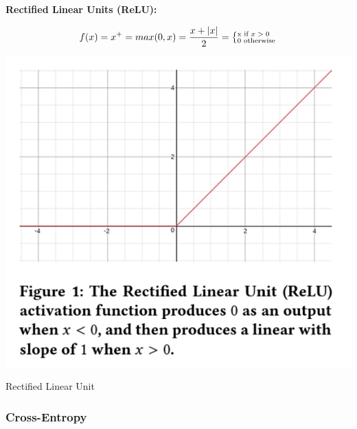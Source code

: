 \documentclass[12pt]{article}
\begin{document}
                \textbf{Rectified Linear Units (ReLU):}
            
                \begin{large}
                    
                    \[ f(x) = x^+ = max(0, x) = \frac{x + \vert x \vert}{2} = 
                    \left \{^{\textnormal{x if $x > 0$}}_{\textnormal{0 otherwise}} \right. \]

                \end{large}

                \begin{table}[ht]
            
                    \begin{center}
    
                        \includegraphics[scale=0.8]{relu.png}
                        \caption{Rectified Linear Unit \cite{agarap2019}}
                        \label{relu-fig}
            
                    \end{center}
                    
                \end{table}            

                
            \subsubsection{Cross-Entropy}
                
\end{document}
